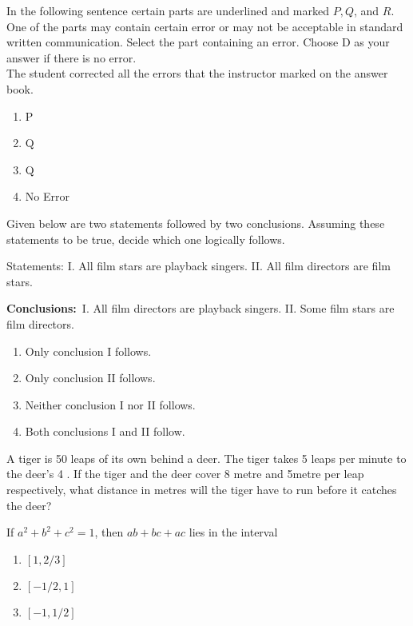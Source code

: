\item In the following sentence certain parts are underlined and marked $P, Q$, and $R$. One of the parts may contain certain error or may not be acceptable in standard written communication. Select the part containing an error. Choose D as your answer if there is no error.\\
The student corrected all the errors that the instructor marked on the answer book.
 \hfill{}
   \begin{multicols}{4}
			\begin{enumerate}
   \item P
\item  Q
\item Q
\item  No Error
\end{enumerate}
		\end{multicols}
  \item  Given below are two statements followed by two conclusions. Assuming these statements to be true, decide which one logically follows.
  

Statements:
I. All film stars are playback singers.
II. All film directors are film stars.

\textbf{Conclusions:}\
I. All film directors are playback singers.
II. Some film stars are film directors.
 \hfill{}
\begin{enumerate}
    
\item  Only conclusion I follows.
  \item  Only conclusion II follows.
\item  Neither conclusion I nor II follows.
 \item  Both conclusions I and II follow.
\end{enumerate}

  \item   A tiger is 50 leaps of its own behind a deer. The tiger takes 5 leaps per minute to the deer's 4 . If the tiger and the deer cover 8 metre and 5metre per leap respectively, what distance in metres will the tiger have to run before it catches the deer?
  \hfill{}
 \item If $a^{2}+b^{2}+c^{2}=1$, then $a b+b c+a c$ lies in the interval
 \hfill{\brak{2015}}
  \begin{multicols}{4}
      
  
  \begin{enumerate}
    \item $[1,2 / 3]$
    \item $[-1 / 2,1]$
    \item  $[-1,1 / 2]$
  \end{enumerate}
  \end{multicols}
  
